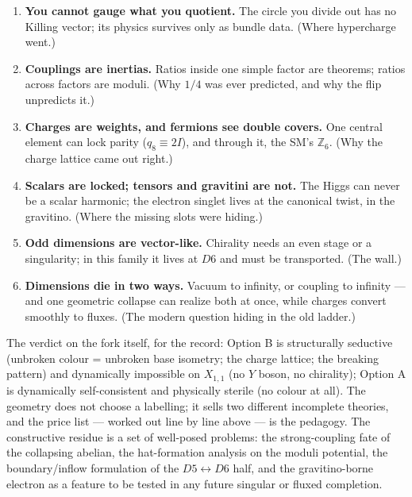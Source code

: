 \documentclass[11pt]{article}
\newcommand{\X}{X_{1,1}}
\begin{document}
\begin{enumerate}
\item \textbf{You cannot gauge what you quotient.} The circle you divide out has no Killing
vector; its physics survives only as bundle data. (Where hypercharge went.)
\item \textbf{Couplings are inertias.} Ratios inside one simple factor are theorems; ratios
across factors are moduli. (Why $1/4$ was ever predicted, and why the flip unpredicts it.)
\item \textbf{Charges are weights, and fermions see double covers.} One central element can
lock parity ($q_8\equiv2I$), and through it, the SM's $\mathbb Z_6$. (Why the charge lattice
came out right.)
\item \textbf{Scalars are locked; tensors and gravitini are not.} The Higgs can never be a
scalar harmonic; the electron singlet lives at the canonical twist, in the gravitino.
(Where the missing slots were hiding.)
\item \textbf{Odd dimensions are vector-like.} Chirality needs an even stage or a
singularity; in this family it lives at $D6$ and must be transported. (The wall.)
\item \textbf{Dimensions die in two ways.} Vacuum to infinity, or coupling to infinity ---
and one geometric collapse can realize both at once, while charges convert smoothly to
fluxes. (The modern question hiding in the old ladder.)
\end{enumerate}

The verdict on the fork itself, for the record: Option B is structurally seductive (unbroken
colour = unbroken base isometry; the charge lattice; the breaking pattern) and dynamically
impossible on $\X$ (no $Y$ boson, no chirality); Option A is dynamically self-consistent and
physically sterile (no colour at all). The geometry does not choose a labelling; it sells
two different incomplete theories, and the price list --- worked out line by line above --- is
the pedagogy. The constructive residue is a set of well-posed problems: the strong-coupling
fate of the collapsing abelian, the hat-formation analysis on the moduli potential, the
boundary/inflow formulation of the $D5\leftrightarrow D6$ half, and the gravitino-borne
electron as a feature to be tested in any future singular or fluxed completion.

\appendix
\end{document}
